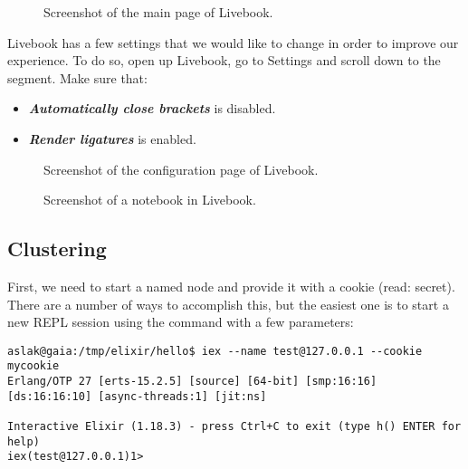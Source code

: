 \begin{figure}[tbp]
  
  \caption{Screenshot of the main page of Livebook.}
  \label{fig:first:elixir:livebook:main}
\end{figure}

Livebook has a few settings that we would like to change in order to improve our experience. To do so, open up Livebook, go to Settings and scroll down to the  segment. Make sure that:
\begin{itemize}
  \item \textbf{\textsl{Automatically close brackets}} is disabled.
  \item \textbf{\textsl{Render ligatures}} is enabled.
\end{itemize}

\begin{figure}[tbp]
  
  \caption{Screenshot of the configuration page of Livebook.}
  \label{fig:first:elixir:livebook:config}
\end{figure}


\begin{figure}[tbp]
  
  \caption{Screenshot of a notebook in Livebook.}
  \label{fig:first:elixir:livebook:notebook}
\end{figure}

\subsection{Clustering}


First, we need to start a named node and provide it with a cookie (read: secret). There are a number of ways to accomplish this, but the easiest one is to start a new REPL session using the  command with a few parameters:

\begin{verbatim}
aslak@gaia:/tmp/elixir/hello$ iex --name test@127.0.0.1 --cookie mycookie 
Erlang/OTP 27 [erts-15.2.5] [source] [64-bit] [smp:16:16] [ds:16:16:10] [async-threads:1] [jit:ns]

Interactive Elixir (1.18.3) - press Ctrl+C to exit (type h() ENTER for help)
iex(test@127.0.0.1)1>
\end{verbatim}

